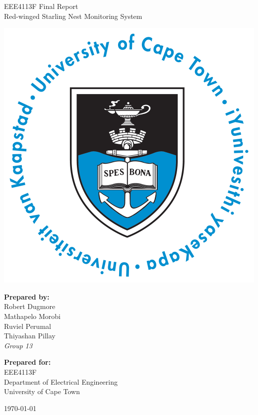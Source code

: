\thispagestyle{empty}
\begin{center}
    
\Huge

\vspace{5cm}

EEE4113F Final Report \\
Red-winged Starling Nest Monitoring System

\vspace{2.5cm}

\includegraphics[width=0.4\linewidth]{FrontMatter/UCT_logo.png}

\vfill

\large
\textbf{Prepared by:}\\
Robert Dugmore\\
Mathapelo Morobi\\
Ruviel Perumal\\
Thiyashan Pillay \\
\textit{Group 13}

\vspace{1cm}

\textbf{Prepared for:}\\
EEE4113F\\
Department of Electrical Engineering\\
University of Cape Town

\vspace{2cm}

\today


\end{center}
